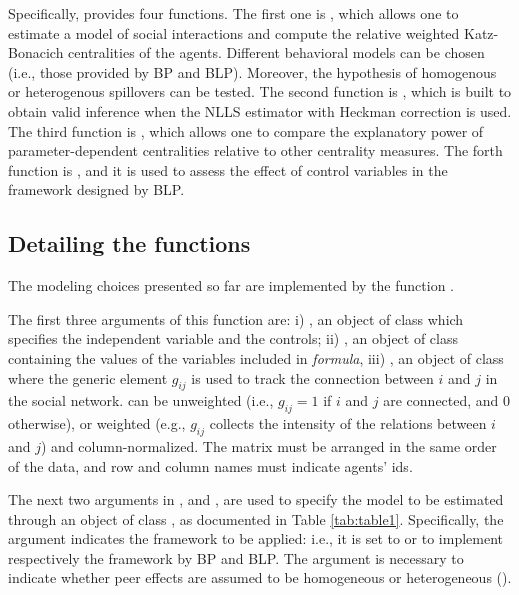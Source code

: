 \documentclass[nojss]{jss}
\begin{document}
Specifically,  provides four functions. The first one is , which allows one to estimate a model of social interactions and compute the relative weighted Katz-Bonacich centralities of the agents. Different behavioral models can be chosen (i.e., those provided by BP and BLP). Moreover, the hypothesis of homogenous or heterogenous spillovers can be tested. The second function is , which is built to obtain valid inference when the NLLS estimator with Heckman correction is used. The third function is , which allows one to compare the explanatory power of parameter-dependent centralities relative to other centrality measures. The forth function is , and it is used to assess the effect of control variables in the framework designed by BLP.

\subsection{Detailing the functions}
The modeling choices presented so far are implemented by the function .

The first three arguments of this function are: i) , an object of class  which specifies the independent variable and the controls; ii) , an object of class  containing the values of the variables included in \textit{formula}, iii) , an object of class  where the generic element $g_{ij}$ is used to track the connection between $i$ and $j$ in the social network.  can be unweighted (i.e., $g_{ij}=1$ if $i$ and $j$ are connected, and 0 otherwise), or weighted (e.g., $g_{ij}$ collects the intensity of the relations between $i$ and $j$) and column-normalized. The matrix must be arranged in the same order of the data, and row and column names must indicate agents' ids.

The next two arguments in ,  and 
, are used to specify the model to be estimated
through an object of class , as documented in Table \ref{tab:table1}. Specifically, the argument  indicates the framework to be applied: i.e., it is set to  or  to implement respectively the framework by BP and BLP. The argument  is necessary to indicate whether peer effects are assumed to be homogeneous  or heterogeneous (). 
\end{document}
